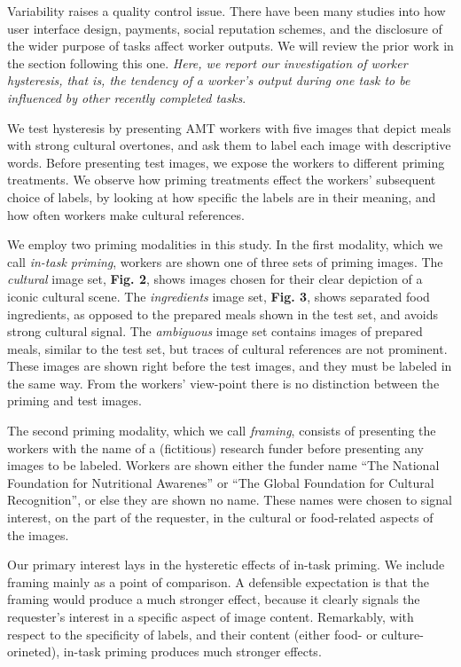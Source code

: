 \documentclass[a4paper]{report}
\begin{document}
Variability raises a quality control issue. There have been many studies 
into how user interface design, payments, social reputation schemes, and the 
disclosure of the wider purpose of tasks affect worker outputs. We will 
review the prior work in the section following this one.
{\em Here, we report our investigation of worker {\em hysteresis}, that is, 
the tendency of a worker's output during one task to be influenced by other 
recently completed tasks}. 

We test hysteresis by presenting AMT workers with
five images that depict meals with strong cultural overtones, and ask them to
label each image with descriptive words.  Before presenting test images,
we expose the workers to different priming treatments.  We observe how priming
treatments effect the workers' subsequent choice of labels, by looking at 
how specific the labels are in their meaning, and how often workers make 
cultural references.

We employ two priming modalities in this study.  
In the first modality, which we call \textit{in-task priming}, workers are 
shown one of three sets of priming images.  The \textit{cultural}
image set, \textbf{Fig. 2}, shows images chosen for their clear depiction of a 
iconic cultural scene.  The \textit{ingredients} image set, \textbf{Fig. 3}, 
shows separated food ingredients, as opposed to the prepared meals shown in 
the test set, and avoids strong cultural signal.  The \textit{ambiguous} 
image set contains images of prepared meals, similar to the test set, but 
traces of cultural references are not prominent.  These images are shown right
before the test images, and they must be labeled in the same way.  From the 
workers' view-point there is no distinction between the priming and test 
images. 

The second priming modality, which we call \textit{framing}, consists of
presenting the workers with the name of a (fictitious) research funder before
presenting any images to be labeled.  Workers are shown either the funder 
name  
``The National Foundation for Nutritional Awarenes'' or ``The Global
Foundation for Cultural Recognition'', or else they are shown no name.  These 
names were chosen to signal interest, on the part of the requester, in the
cultural or food-related aspects of the images.

Our primary interest lays in the hysteretic effects of in-task priming.  We
include framing mainly as a point of comparison.  A defensible expectation is
that the framing would produce a much stronger effect, because it clearly 
signals the requester's interest in a specific aspect of image content. 
Remarkably, with respect to the specificity of labels, and their content 
(either food- or culture-orineted), in-task priming produces much stronger 
effects.
\end{document}
